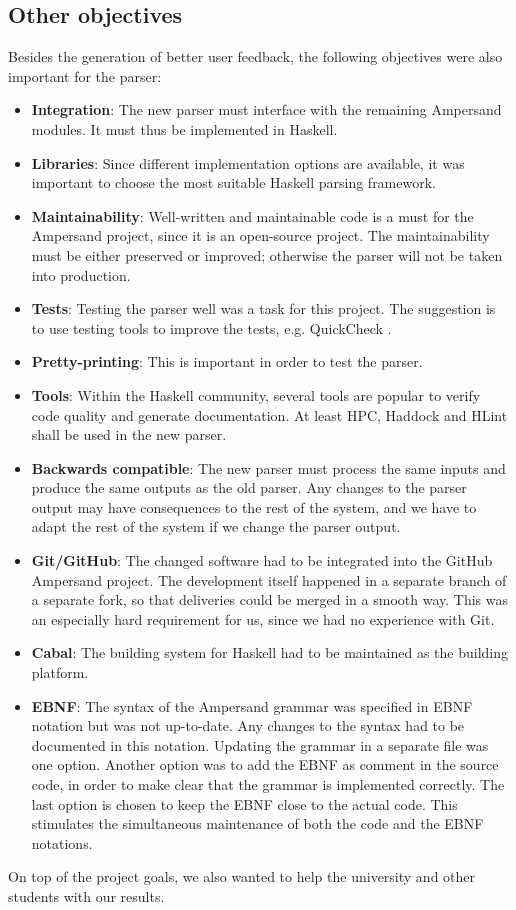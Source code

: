 
\subsection{Other objectives}
Besides the generation of better user feedback, the following objectives were also important for the parser:
\begin{itemize}
  \item \textbf{Integration}: The new parser must interface with the remaining Ampersand modules.
    It must thus be implemented in Haskell.
  \item \textbf{Libraries}: Since different implementation options are available, it was important to choose the most suitable Haskell parsing framework.
  \item \textbf{Maintainability}: Well-written and maintainable code is a must for the Ampersand project, since it is an open-source project.
    The maintainability must be either preserved or improved; otherwise the parser will not be taken into production.
  \item \textbf{Tests}: Testing the parser well was a task for this project.
    The suggestion is to use testing tools to improve the tests, e.g. QuickCheck .
  \item \textbf{Pretty-printing}: This is important in order to test the parser.
%
%
%
  \item \textbf{Tools}: Within the Haskell community, several tools are popular to verify code quality and generate documentation.
    At least HPC, Haddock and HLint shall be used in the new parser.
  \item \textbf{Backwards compatible}: The new parser must process the same inputs and produce the same outputs as the old parser.
    Any changes to the parser output may have consequences to the rest of the system, and we have to adapt the rest of the system if we change the parser output.
  \item \textbf{Git/GitHub}: The changed software had to be integrated into the GitHub Ampersand project.
    The development itself happened in a separate branch of a separate fork, so that deliveries could be merged in a smooth way.
    This was an especially hard requirement for us, since we had no experience with Git.
  \item \textbf{Cabal}: The building system for Haskell had to be maintained as the building platform.
  \item \textbf{EBNF}: The syntax of the Ampersand grammar was specified in EBNF notation but was not up-to-date.
    Any changes to the syntax had to be documented in this notation.
    Updating the grammar in a separate file was one option.
    Another option was to add the EBNF as comment in the source code, in order to make clear that the grammar is implemented correctly.
    The last option is chosen to keep the EBNF close to the actual code.
    This stimulates the simultaneous maintenance of both the code and the EBNF notations.
\end{itemize}
%
On top of the project goals, we also wanted to help the university and other students with our results.
